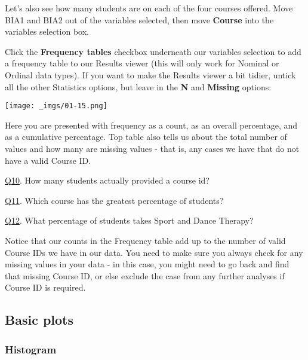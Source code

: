 \documentclass[
  letterpaper,
  DIV=11,
  numbers=noendperiod]{scrartcl}
\begin{document}
Let's also see how many students are on each of the four courses
offered. Move BIA1 and BIA2 out of the variables selected, then move
\textbf{Course} into the variables selection box.

Click the \textbf{Frequency tables} checkbox underneath our variables
selection to add a frequency table to our Results viewer (this will only
work for Nominal or Ordinal data types). If you want to make the Results
viewer a bit tidier, untick all the other Statistics options, but leave
in the \textbf{N} and \textbf{Missing} options:

\texttt{[image: \_imgs/01-15.png]}

Here you are presented with frequency as a count, as an overall
percentage, and as a cumulative percentage. Top table also tells us
about the total number of values and how many are missing values - that
is, any cases we have that do not have a valid Course ID.

\begin{tcolorbox}[beforeafter skip=1cm, ignore nobreak=true, breakable, colframe=Questions-frame, colback=Questions-bg, coltext=Questions-text, boxsep=2mm, arc=0mm, boxrule=0.5mm]

\protect\hypertarget{Q10}{\protect\hyperlink{A10}{Q10}}. How many
students actually provided a course id?

\protect\hypertarget{Q11}{\protect\hyperlink{A11}{Q11}}. Which course
has the greatest percentage of students?

\protect\hypertarget{Q12}{\protect\hyperlink{A12}{Q12}}. What percentage
of students takes Sport and Dance Therapy?

\end{tcolorbox}

Notice that our counts in the Frequency table add up to the number of
valid Course IDs we have in our data. You need to make sure you always
check for any missing values in your data - in this case, you might need
to go back and find that missing Course ID, or else exclude the case
from any further analyses if Course ID is required.

\hypertarget{basic-plots}{%
\subsection{Basic plots}\label{basic-plots}}

\hypertarget{histogram}{%
\subsubsection{Histogram}\label{histogram}}
\end{document}
